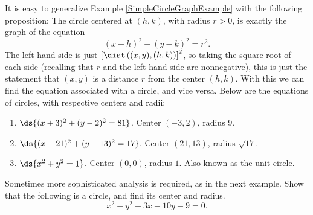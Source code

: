 It is easy to generalize Example \ref{SimpleCircleGraphExample}
with the following proposition:
\bprop The circle centered at $(h,k)$, with radius $r>0$, is 
exactly the graph of the equation
\begin{equation}(x-h)^2+(y-k)^2=r^2.
	\label{EquationOfCircle}\end{equation} 
\eprop 
The left hand side is just $\left[\dist\left((x,y),(h,k)\right)\right]^2$,
so taking the square root of each side (recalling that $r$ and
the left hand side are nonnegative),
this is just the statement that $(x,y)$ is a distance $r$ from
the center $(h,k)$. With this we can find the equation associated
with a circle, and vice versa.
\bex Below are the equations of circles, with respective centers and radii: 
\begin{enumerate}
\item $\ds{(x+3)^2+(y-2)^2=81}$.  Center $(-3,2)$, radius $9$. 
\item $\ds{(x-21)^2+(y-13)^2=17}$.  Center $(21,13)$, radius $\sqrt{17}$. 
\item $\ds{x^2+y^2=1}$.  Center $(0,0)$, radius $1$.  Also known as
the \underline{unit circle}.
\end{enumerate}
\eex
Sometimes more sophisticated analysis is required, as in the next example.
\bex Show that the following is a circle, and find its center and radius.
$$x^2+y^2+3x-10y-9=0.$$

